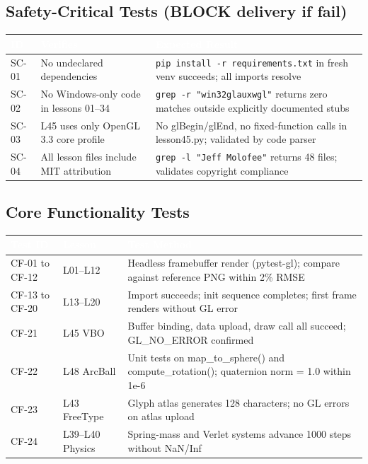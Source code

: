 \documentclass[11pt,letterpaper]{article}
\newcommand{\tableheader}[1]{\textbf{\sffamily\textcolor{white}{#1}}}
\begin{document}
\subsection{Safety-Critical Tests (BLOCK delivery if fail)}

\begin{center}
\begin{tabularx}{\textwidth}{L{1.2cm}L{4cm}X}
\toprule
{}
\tableheader{ID} & \tableheader{Verifies} & \tableheader{Expected Result} \\
\midrule
SC-01 & No undeclared dependencies & \texttt{pip install -r requirements.txt} in fresh venv succeeds; all imports resolve \\
SC-02 & No Windows-only code in lessons 01--34 & \texttt{grep -r "win32\textbar{}glaux\textbar{}wgl"} returns zero matches outside explicitly documented stubs \\
SC-03 & L45 uses only OpenGL 3.3 core profile & No glBegin/glEnd, no fixed-function calls in lesson45.py; validated by code parser \\
SC-04 & All lesson files include MIT attribution & \texttt{grep -l "Jeff Molofee"} returns 48 files; validates copyright compliance \\
\bottomrule
\end{tabularx}
\end{center}

\subsection{Core Functionality Tests}

\begin{center}
\begin{tabularx}{\textwidth}{L{2cm}L{3.5cm}X}
\toprule
{}
\tableheader{Test ID} & \tableheader{Lesson} & \tableheader{Test Method} \\
\midrule
CF-01 to CF-12 & L01--L12 & Headless framebuffer render (pytest-gl); compare against reference PNG within 2\% RMSE \\
CF-13 to CF-20 & L13--L20 & Import succeeds; init sequence completes; first frame renders without GL error \\
CF-21 & L45 VBO & Buffer binding, data upload, draw call all succeed; GL\_NO\_ERROR confirmed \\
CF-22 & L48 ArcBall & Unit tests on map\_to\_sphere() and compute\_rotation(); quaternion norm = 1.0 within 1e-6 \\
CF-23 & L43 FreeType & Glyph atlas generates 128 characters; no GL errors on atlas upload \\
CF-24 & L39--L40 Physics & Spring-mass and Verlet systems advance 1000 steps without NaN/Inf \\
\bottomrule
\end{tabularx}
\end{center}
\end{document}
